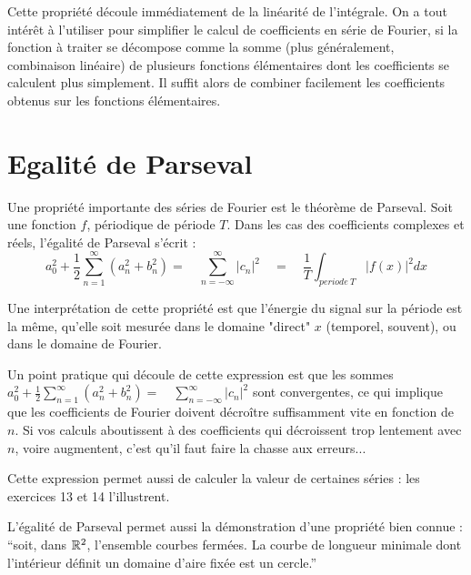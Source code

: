 Cette propriété découle immédiatement de la linéarité de l'intégrale. On a tout intérêt à l'utiliser pour simplifier le calcul de coefficients en série de Fourier,  si la fonction à traiter se décompose comme la somme (plus généralement, combinaison linéaire) de plusieurs fonctions élémentaires dont les coefficients se calculent plus simplement. Il suffit alors de combiner facilement les coefficients obtenus sur les fonctions élémentaires.

\section{Egalité de Parseval}

Une propriété importante des séries de Fourier est le théorème de
Parseval. Soit une fonction $f$, périodique de période $T$. Dans les cas des coefficients complexes et réels, l'égalité de Parseval s'écrit :
\begin{equation}
a_0^2+\frac{1}{2}\sum_{n=1}^\infty (a_n^2+b_n^2)=\quad \sum_{n=-\infty}^\infty | c_n|^2 \quad=\quad \frac{1}{T}\int_{periode~T}|f(x)|^2 dx
\end{equation}

Une interprétation de cette propriété est que l'énergie du signal sur la période est la même, qu'elle soit mesurée dans le domaine "direct" $x$ (temporel, souvent), ou dans le domaine de Fourier. 

Un point pratique qui découle de cette expression est que les sommes $a_0^2 + \frac{1}{2}\sum_{n=1}^\infty (a_n^2+b_n^2)=\quad\sum_{n=-\infty}^\infty | c_n|^2 $ sont convergentes, ce qui implique que les coefficients de Fourier doivent décroître suffisamment vite en fonction de $n$. Si vos calculs aboutissent à des coefficients qui décroissent trop lentement avec $n$, voire augmentent, c'est qu'il faut faire la chasse aux erreurs...

Cette expression permet aussi de calculer la valeur de certaines séries : les exercices 13 et 14 l'illustrent.

L'égalité de Parseval permet aussi la démonstration d'une propriété bien connue : ``soit, dans $\mathbb{R}^2$, l'ensemble courbes fermées. La courbe de longueur minimale dont l'intérieur définit un domaine d'aire fixée est un cercle.''



